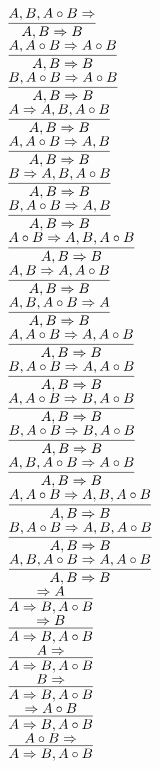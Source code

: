 \documentclass[11pt]{article}
\begin{document}
\begin{center}
\\$\infer{A, B\Rightarrow B}{A, B, A\circ B\Rightarrow }$
\bigskip
\\$\infer{A, B\Rightarrow B}{A, A\circ B\Rightarrow A\circ B}$
\bigskip
\\$\infer{A, B\Rightarrow B}{B, A\circ B\Rightarrow A\circ B}$
\bigskip
\\$\infer{A, B\Rightarrow B}{A\Rightarrow A, B, A\circ B}$
\bigskip
\\$\infer{A, B\Rightarrow B}{A, A\circ B\Rightarrow A, B}$
\bigskip
\\$\infer{A, B\Rightarrow B}{B\Rightarrow A, B, A\circ B}$
\bigskip
\\$\infer{A, B\Rightarrow B}{B, A\circ B\Rightarrow A, B}$
\bigskip
\\$\infer{A, B\Rightarrow B}{A\circ B\Rightarrow A, B, A\circ B}$
\bigskip
\\$\infer{A, B\Rightarrow B}{A, B\Rightarrow A, A\circ B}$
\bigskip
\\$\infer{A, B\Rightarrow B}{A, B, A\circ B\Rightarrow A}$
\bigskip
\\$\infer{A, B\Rightarrow B}{A, A\circ B\Rightarrow A, A\circ B}$
\bigskip
\\$\infer{A, B\Rightarrow B}{B, A\circ B\Rightarrow A, A\circ B}$
\bigskip
\\$\infer{A, B\Rightarrow B}{A, A\circ B\Rightarrow B, A\circ B}$
\bigskip
\\$\infer{A, B\Rightarrow B}{B, A\circ B\Rightarrow B, A\circ B}$
\bigskip
\\$\infer{A, B\Rightarrow B}{A, B, A\circ B\Rightarrow A\circ B}$
\bigskip
\\$\infer{A, B\Rightarrow B}{A, A\circ B\Rightarrow A, B, A\circ B}$
\bigskip
\\$\infer{A, B\Rightarrow B}{B, A\circ B\Rightarrow A, B, A\circ B}$
\bigskip
\\$\infer{A, B\Rightarrow B}{A, B, A\circ B\Rightarrow A, A\circ B}$
\bigskip
\\$\infer{A\Rightarrow B, A\circ B}{\Rightarrow A}$
\bigskip
\\$\infer{A\Rightarrow B, A\circ B}{\Rightarrow B}$
\bigskip
\\$\infer{A\Rightarrow B, A\circ B}{A\Rightarrow }$
\bigskip
\\$\infer{A\Rightarrow B, A\circ B}{B\Rightarrow }$
\bigskip
\\$\infer{A\Rightarrow B, A\circ B}{\Rightarrow A\circ B}$
\bigskip
\\$\infer{A\Rightarrow B, A\circ B}{A\circ B\Rightarrow }$

\end{center}
\end{document}
